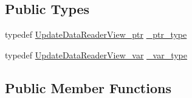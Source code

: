 \subsection*{Public Types}
\begin{DoxyCompactItemize}
\item 
typedef \hyperlink{classKnowledge_1_1UpdateDataReaderView}{UpdateDataReaderView\_\-ptr} \hyperlink{classKnowledge_1_1UpdateDataReaderView_a4c3a2a03673aca411627e9dbb1bf9dcf}{\_\-ptr\_\-type}
\item 
typedef \hyperlink{namespaceKnowledge_ad97d086c37b8c4370a3dbd0fa1f4b86a}{UpdateDataReaderView\_\-var} \hyperlink{classKnowledge_1_1UpdateDataReaderView_ae036155ce21cb7d4ce5659d67b0fb234}{\_\-var\_\-type}
\end{DoxyCompactItemize}
\subsection*{Public Member Functions}
